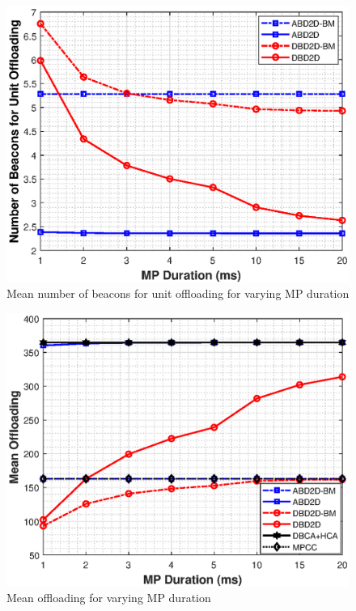 \documentclass[10pt,a4paper,twocolumn]{article}
\begin{document}
\begin{figure}[!htb]
	\centering
	
	\includegraphics[width=\columnwidth]{MPdur1.eps}
	\caption{Mean number of beacons for unit offloading for varying MP duration}
	\label{fig:MPdur1}
\end{figure}

\begin{figure}[!htb]
	\centering
	
	\includegraphics[width=\columnwidth]{MPdur2.eps}
	\caption{Mean offloading for varying MP duration}
	\label{fig:MPdur2}
\end{figure}
\end{document}
